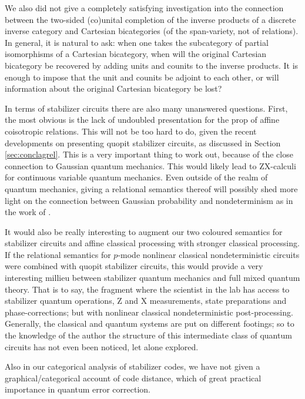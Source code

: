 We also did not give a completely satisfying investigation into the connection between the two-sided (co)unital completion of the inverse products of a discrete inverse category and Cartesian bicategories (of the span-variety, not of relations).  In general, it is natural to ask: when one takes the subcategory of partial isomorphisms of a Cartesian bicategory, when will the original Cartesian bicategory be recovered by adding units and counits to the inverse products.  It is enough to impose that the unit and counits be adjoint to each other, or will information about the original Cartesian bicategory be lost?


In terms of stabilizer circuits there are also many unanswered questions.  First, the most obvious is the lack of undoubled presentation for the prop of affine coisotropic relations.  This will not be too hard to do, given the recent developments on presenting quopit stabilizer circuits, as discussed in Section \ref{sec:conclagrel}.  This is a very important thing to work out, because of the close connection to Gaussian quantum mechanics.  This would likely lead to ZX-calculi for continuous variable quantum mechanics.  Even outside of the realm of quantum mechanics, giving  a relational semantics thereof will possibly shed more light on the connection between Gaussian probability and nondeterminism as in the work of \cite{stein}.


It would also be really interesting to augment our two coloured semantics for stabilizer circuits and affine classical processing with stronger classical processing.  If the relational semantics for $p$-mode nonlinear classical nondeterministic circuits were combined with quopit stabilizer circuits, this would provide a very interesting millieu between stabilizer quantum mechanics and full mixed quantum theory.  That is to say, the fragment where the scientist in the lab has access to stabilizer quantum operations, Z and X measurements, state preparations and phase-corrections; but with nonlinear classical nondeterministic post-processing.  Generally, the classical and quantum systems are put on different footings; so to the knowledge of the author the structure of this intermediate class of quantum circuits has not even been noticed, let alone explored.

Also in our categorical analysis of stabilizer codes, we have not given a graphical/categorical account of code distance, which of great practical importance in quantum error correction. 

